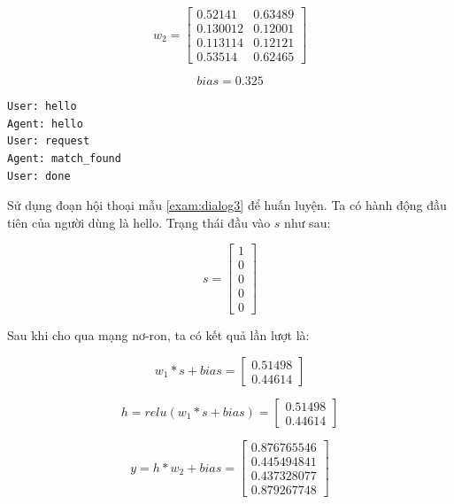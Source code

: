 \begin{equation*}
    w_2 = 
    \begin{bmatrix}
        0.52141 & 0.63489 \\
        0.130012 & 0.12001 \\
        0.113114 & 0.12121 \\
        0.53514 & 0.62465
    \end{bmatrix}
\end{equation*}

\begin{equation*}
    bias = 0.325
\end{equation*}

\renewcommand{\lstlistingname}{Ví dụ}
\begin{lstlisting}[caption={Một mẫu đoạn hội thoại},label={exam:dialog3},language=exam_en,firstnumber=1]
User: hello
Agent: hello
User: request
Agent: match_found
User: done
\end{lstlisting}

Sử dụng đoạn hội thoại mẫu \ref{exam:dialog3} để huấn luyện. Ta có hành động đầu tiên của người dùng là hello. Trạng thái đầu vào $s$ như sau:

\begin{equation*}
    s = 
    \begin{bmatrix}
        1 \\
        0 \\
        0 \\
        0 \\
        0
    \end{bmatrix}
\end{equation*}

Sau khi cho qua mạng nơ-ron, ta có kết quả lần lượt là:

\begin{equation*}
    w_1*s + bias = 
    \begin{bmatrix}
        0.51498 \\
        0.44614
    \end{bmatrix}
\end{equation*}

\begin{equation*}
    h = relu(w_1*s + bias) = 
    \begin{bmatrix}
        0.51498 \\
        0.44614
    \end{bmatrix}
\end{equation*}

\begin{equation*}
    y = h*w_2 + bias = 
    \begin{bmatrix}
        0.876765546 \\
        0.445494841 \\
        0.437328077 \\
        0.879267748
    \end{bmatrix}
\end{equation*}

